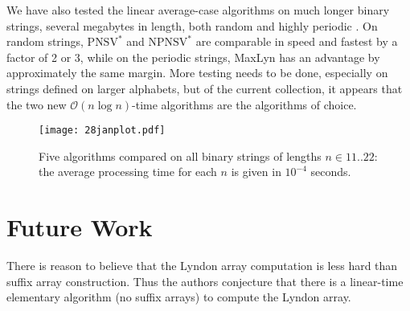 \documentclass[10pt]{llncs}
\def\O{\mathcal{O}}
\def\NSV{\mbox{NSV}}
\begin{document}
We have also tested the linear average-case algorithms on much longer binary strings,
several megabytes in length,
both random and highly periodic \cite{FSS03}.
On random strings, P$\NSV^*$ and NP$\NSV^*$ are comparable in speed
and fastest by a factor of 2 or 3,
while on the periodic strings, MaxLyn has an advantage by approximately
the same margin.
More testing needs to be done,
especially on strings defined on larger alphabets,
but of the current collection,
it appears that the two new $\O(n\log n)$-time algorithms
are the algorithms of choice.
\begin{figure}[htbp]
\centering
\texttt{[image: 28janplot.pdf]}
\caption{Five algorithms compared on all binary strings of lengths $n \in 11..22$: the average processing time for each $n$ is given in $10^{-4}$ seconds.}
\label{fig-binary}
\end{figure}

\section{Future Work}
\label{sect-future}
There is reason to believe \cite{K14}
that the Lyndon array computation is less hard than
suffix array construction.
Thus the authors conjecture that there is a linear-time elementary
algorithm (no suffix arrays) to compute the Lyndon array.

\def\AAIM{International Conference on Algorithmic Aspects in Information \& Management}
\def\AJC{Australasian J.\ Combinatorics}
\def\AWOCA{Australasian Workshop on Combinatorial Algs.}
\def\CPM{Annual Symp.\ Combinatorial Pattern Matching}
\def\COCOON{Annual International Computing \& Combinatorics Conference}
\def\FOCS{IEEE Symp.\ Found.\ Computer Science}
\def\AESA{Annual European Symp.\ on Algs.}
\def\LATA{Internat.\ Conf.\ on Language \& Automata Theory \& Applications}
\def\IWOCA{Internat.\ Workshop on Combinatorial Algs.}
\def\AWOCA{Australasian Workshop on Combinatorial Algs.}
\def\STACS{Symp.\ Theoretical Aspects of Computer Science}
\def\ICALP{Internat.\ Colloq.\ Automata, Languages \& Programming}
\def\IJFCS{Internat.\ J.\ Foundations of Computer Science}
\def\ISAAC{Internat.\ Symp.\ Algs.\ \& Computation}
\def\SWAT{Scandinavian Workshop on Alg.\ Theory}
\def\PSC{Prague Stringology Conf.}
\def\ALG{Algorithmica }
\def\CSUR{ACM Computing Surveys}
\def\DAM{Discrete Applied Math.}
\def\FI{Fundamenta Informaticae}
\def\IPL{Inform.\ Process.\ Lett.\ }
\def\InfComp{Inform.\ \& Computation}
\def\IS{Inform.\ Sciences}
\def\JACM{J.\ Assoc.\ Comput.\ Mach.\ }
\def\JCTA{J.\ Combinatorial Theory, Series A}
\def\CACM{Commun.\ Assoc.\ Comput.\ Mach.\ }
\def\MCS{Math.\ in Computer Science}
\def\SICOMP{SIAM J.\ Computing}
\def\SIDMA{SIAM J.\ Discrete Math.\ }
\def\JCB{J.\ Computational Biology\ }
\def\JA{J.\ Algorithms }
\def\JDA{J.\ Discrete Algorithms }
\def\JALC{J.\ Automata, Languages \& Combinatorics\ }
\def\SODA{ACM-SIAM Symp.\ Discrete Algs.\ }
\def\SPE{Software, Practice \& Experience\ }
\def\TCJ{The Computer Journal}
\def\TCS{Theoret.\ Comput.\ Sci.\ }
\end{document}
